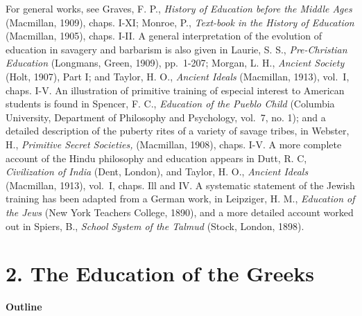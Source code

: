 \documentclass[
]{book}
\begin{document}
For general works, see Graves, F. P., \emph{History of Education before the Middle Ages} (Macmillan, 1909), chaps. I-XI; Monroe, P., \emph{Text-book in the History of Education} (Macmillan, 1905), chaps. I-II. A general interpretation of the evolution of education in savagery and barbarism is also given in Laurie, S. S., \emph{Pre-Christian Education} (Longmans, Green, 1909), pp.~1-207; Morgan, L. H., \emph{Ancient Society} (Holt, 1907), Part I; and Taylor, H. O., \emph{Ancient Ideals} (Macmillan, 1913), vol.~I, chaps. I-V. An illustration of primitive training of especial interest to American students is found in Spencer, F. C., \emph{Education of the Pueblo Child} (Columbia University, Department of Philosophy and Psychology, vol.~7, no. 1); and a detailed description of the puberty rites of a variety of savage tribes, in Webster, H., \emph{Primitive Secret Societies,} (Macmillan, 1908), chaps. I-V. A more complete account of the Hindu philosophy and education appears in Dutt, R. C, \emph{Civilization of India} (Dent, London), and Taylor, H. O., \emph{Ancient Ideals} (Macmillan, 1913), vol.~I, chaps. Ill and IV. A systematic statement of the Jewish training has been adapted from a German work, in Leipziger, H. M., \emph{Education of the Jews} (New York Teachers College, 1890), and a more detailed account worked out in Spiers, B., \emph{School System of the Talmud} (Stock, London, 1898).

\hypertarget{the-education-of-the-greeks}{%
\chapter{2. The Education of the Greeks}\label{the-education-of-the-greeks}}

\textbf{Outline}
\end{document}
